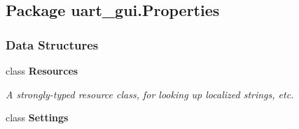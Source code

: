 \hypertarget{namespaceuart__gui_1_1_properties}{\subsection{Package uart\-\_\-gui.\-Properties}
\label{namespaceuart__gui_1_1_properties}
}
\subsubsection*{Data Structures}
\begin{DoxyCompactItemize}
\item 
class {\bfseries Resources}
\begin{DoxyCompactList}\small\item\em A strongly-\/typed resource class, for looking up localized strings, etc. \end{DoxyCompactList}\item 
class {\bfseries Settings}
\end{DoxyCompactItemize}
